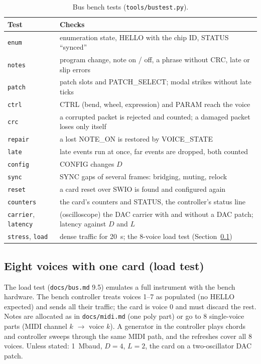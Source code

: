 \documentclass[11pt,a4paper]{article}
\newcommand{\file}[1]{\texttt{#1}}
\begin{document}
\begin{table}[htbp]
\centering\small
\caption{Bus bench tests (\file{tools/bustest.py}).}\label{tab:bustest}
\begin{tabularx}{\textwidth}{@{}l X@{}}
\toprule
Test & Checks \\
\midrule
\texttt{enum} & enumeration state, HELLO with the chip ID, STATUS ``synced'' \\
\texttt{notes} & program change, note on / off, a phrase without CRC, late or slip errors \\
\texttt{patch} & patch slots and PATCH\_SELECT; modal strikes without late ticks \\
\texttt{ctrl} & CTRL (bend, wheel, expression) and PARAM reach the voice \\
\texttt{crc} & a corrupted packet is rejected and counted; a damaged packet loses only itself \\
\texttt{repair} & a lost NOTE\_ON is restored by VOICE\_STATE \\
\texttt{late} & late events run at once, far events are dropped, both counted \\
\texttt{config} & CONFIG changes $D$ \\
\texttt{sync} & SYNC gaps of several frames: bridging, muting, relock \\
\texttt{reset} & a card reset over SWIO is found and configured again \\
\texttt{counters} & the card's counters and STATUS, the controller's status line \\
\texttt{carrier}, \texttt{latency} & (oscilloscope) the DAC carrier with and without a DAC patch; latency against $D$ and $L$ \\
\texttt{stress}, \texttt{load} & dense traffic for \SI{20}{s}; the 8-voice load test (Section~\ref{sec:load}) \\
\bottomrule
\end{tabularx}
\end{table}

\subsection{Eight voices with one card (load test)}\label{sec:load}
The load test (\file{docs/bus.md} 9.5) emulates a full instrument with the bench hardware. The bench controller treats
voices 1--7 as populated (no HELLO expected) and sends all their traffic; the card is voice 0 and must discard the
rest. Notes are allocated as in \file{docs/midi.md} (one poly part) or go to 8 single-voice parts (MIDI channel $k$
$\to$ voice $k$). A generator in the controller plays chords and controller sweeps through the same MIDI path, and the
refreshes cover all 8 voices. Unless stated: \SI{1}{Mbaud}, $D = 4$, $L = 2$, the card on a two-oscillator DAC patch.
\end{document}
